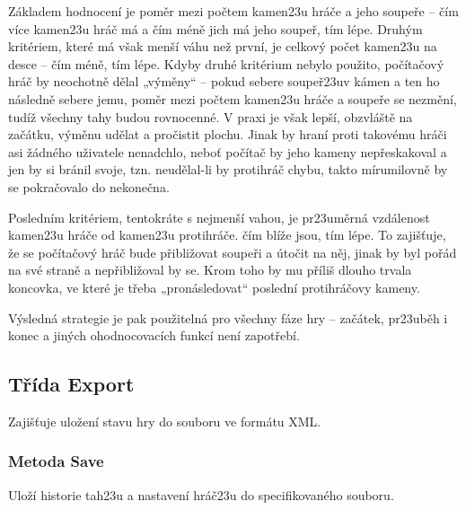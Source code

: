 \documentclass{article}
\begin{document}
Z\'akladem hodnocen\'i je pom\v{e}r mezi po\v{c}tem kamen\accent23u hr\'a\v{c}e a jeho soupe\v{r}e – \v{c}\'im v\'ice kamen\accent23u hr\'a\v{c} m\'a a \v{c}\'im m\'en\v{e} jich m\'a jeho soupe\v{r}, t\'im l\'epe. Druh\'ym krit\'eriem, kter\'e m\'a v\v{s}ak men\v{s}\'i v\'ahu ne\v{z} prvn\'i, je celkov\'y po\v{c}et kamen\accent23u na desce – \v{c}\'im m\'en\v{e}, t\'im l\'epe. Kdyby druh\'e krit\'erium nebylo pou\v{z}ito, po\v{c}\'ita\v{c}ov\'y hr\'a\v{c} by neochotn\v{e} d\v{e}lal „v\'ym\v{e}ny“ – pokud sebere soupe\v{r}\accent23uv k\'amen a ten ho n\'asledn\v{e} sebere jemu, pom\v{e}r mezi po\v{c}tem kamen\accent23u hr\'a\v{c}e a soupe\v{r}e se nezm\v{e}n\'i, tud\'i\v{z} v\v{s}echny tahy budou rovnocenn\'e. V praxi je v\v{s}ak lep\v{s}\'i, obzvl\'a\v{s}t\v{e} na za\v{c}\'atku, v\'ym\v{e}nu ud\v{e}lat a pro\v{c}istit plochu. Jinak by hran\'i proti takov\'emu hr\'a\v{c}i asi \v{z}\'adn\'eho u\v{z}ivatele nenadchlo, nebo\v{t} po\v{c}\'ita\v{c} by jeho kameny nep\v{r}eskakoval a jen by si br\'anil svoje, tzn. neud\v{e}lal-li by protihr\'a\v{c} chybu, takto m\'irumilovn\v{e} by se pokra\v{c}ovalo do nekone\v{c}na.\medskip

Posledn\'im krit\'eriem, tentokr\'ate s nejmen\v{s}\'i vahou, je pr\accent23um\v{e}rn\'a vzd\'alenost kamen\accent23u hr\'a\v{c}e od kamen\accent23u protihr\'a\v{c}e. \v{c}\'im bl\'i\v{z}e jsou, t\'im l\'epe. To zaji\v{s}\v{t}uje, \v{z}e se po\v{c}\'ita\v{c}ov\'y hr\'a\v{c} bude p\v{r}ibli\v{z}ovat soupe\v{r}i a \'uto\v{c}it na n\v{e}j, jinak by byl po\v{r}\'ad na sv\'e stran\v{e} a nep\v{r}ibli\v{z}oval by se. Krom toho by mu p\v{r}\'ili\v{s} dlouho trvala koncovka, ve kter\'e je t\v{r}eba „pron\'asledovat“ posledn\'i protihr\'a\v{c}ovy kameny.\medskip

V\'ysledn\'a strategie je pak pou\v{z}iteln\'a pro v\v{s}echny f\'aze hry – za\v{c}\'atek, pr\accent23ub\v{e}h i konec a jin\'ych ohodnocovac\'ich funkc\'i nen\'i zapot\v{r}eb\'i.



\subsection{T\v{r}\'ida Export}
Zaji\v{s}\v{t}uje ulo\v{z}en\'i stavu hry do souboru ve form\'atu XML.

\subsubsection{Metoda Save}
Ulo\v{z}\'i historie tah\accent23u a nastaven\'i hr\'a\v{c}\accent23u do specifikovan\'eho souboru.
\end{document}
